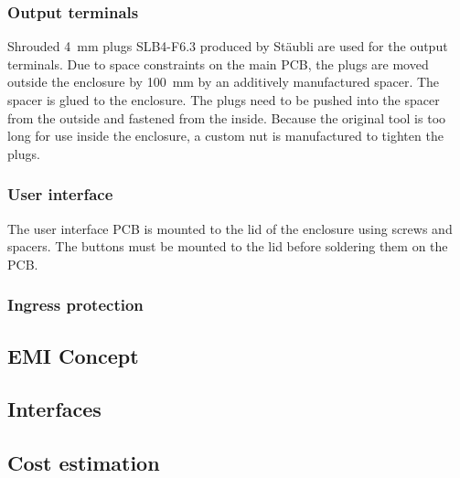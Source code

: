 \subsubsection{Output terminals}
Shrouded \qty{4}{\milli\meter} plugs SLB4-F6.3 produced by Stäubli are used for the output terminals. Due to space constraints on the main PCB, the plugs are moved outside the enclosure by \qty{100}{\milli\meter}  by an additively manufactured spacer. The spacer is glued to the enclosure.  The plugs need to be pushed into the spacer from the outside and fastened from the inside. Because the original tool  is too long for use inside the enclosure, a custom nut is manufactured to tighten the plugs. 

\subsubsection{User interface}
The user interface PCB is mounted to the lid of the enclosure using screws and spacers. The buttons must be mounted to the lid before soldering them on the PCB. 

\subsubsection{Ingress protection}

\FloatBarrier
\subsection{EMI Concept}

\FloatBarrier
\subsection{Interfaces}

\FloatBarrier
\subsection{Cost estimation}





